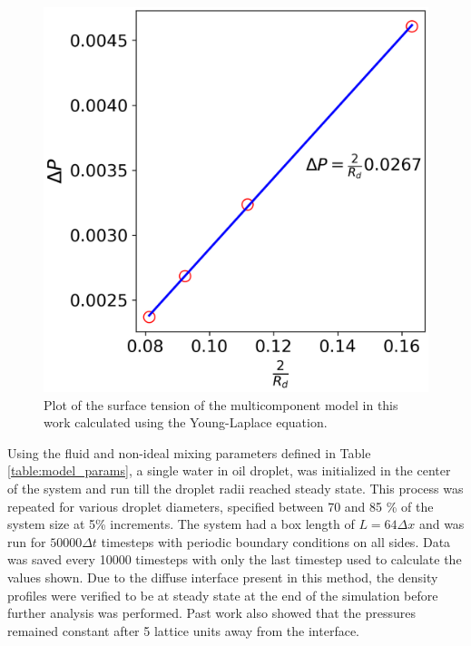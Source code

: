\begin{figure}[h]
    \centering
    \includegraphics[scale = 0.5]{figures/model_validation/surface_tension.png}
    \caption{Plot of the surface tension of the multicomponent model in this work calculated using the 
    Young-Laplace equation.}
    \label{fig:young_laplace_valid}
\end{figure}

Using the fluid and non-ideal mixing parameters defined in Table \ref{table:model_params}, a single water in oil 
droplet, was initialized in the center of the system and run till the droplet radii reached steady state. 
This process was repeated for various droplet diameters, specified between 70 and 85 \% of the system size at 5\% 
increments. The system had a box length of $L = 64 \Delta x$ and was run for $50000 \Delta t$ timesteps with periodic boundary conditions 
on all sides. Data was saved every 10000 timesteps with only the last timestep used to calculate the values shown. Due 
to the diffuse interface present in this method, the density profiles were verified to be at steady state at the end of 
the simulation before further analysis was performed. \cite{frijters_effects_2012} Past work also showed that the 
pressures remained constant after 5 lattice units away from the interface. \cite{frijters_effects_2012} 

